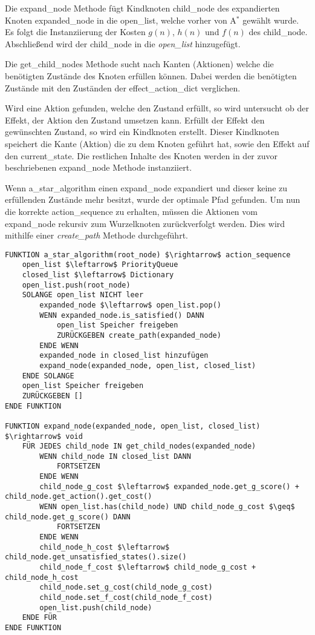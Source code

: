 Die expand\_node Methode fügt Kindknoten child\_node des expandierten Knoten expanded\_node in die open\_list, welche vorher von A$^*$ gewählt wurde. Es folgt die Instanziierung der Kosten $g(n)$, $h(n)$ und $f(n)$ des child\_node. Abschließend wird der child\_node in die \textit{open\_list} hinzugefügt.

Die get\_child\_nodes Methode sucht nach Kanten (Aktionen) welche die benötigten Zustände des Knoten erfüllen können. Dabei werden die benötigten Zustände mit den Zuständen der effect\_action\_dict verglichen.

Wird eine Aktion gefunden, welche den Zustand erfüllt, so wird untersucht ob der Effekt, der Aktion den Zustand umsetzen kann. Erfüllt der Effekt den gewünschten Zustand, so wird ein Kindknoten erstellt. Dieser Kindknoten speichert die Kante (Aktion) die zu dem Knoten geführt hat, sowie den Effekt auf den current\_state. Die restlichen Inhalte des Knoten werden in der zuvor beschriebenen expand\_node Methode instanziiert.

Wenn a\_star\_algorithm einen expand\_node expandiert und dieser keine zu erfüllenden Zustände mehr besitzt, wurde der optimale Pfad gefunden. Um nun die korrekte action\_sequence zu erhalten, müssen die Aktionen vom expand\_node rekursiv zum Wurzelknoten zurückverfolgt werden. Dies wird mithilfe einer \textit{create\_path} Methode durchgeführt.

\begin{lstlisting}[language=Pseudo, caption={update Methode des GoapAgent}, mathescape=true]
FUNKTION a_star_algorithm(root_node) $\rightarrow$ action_sequence
	open_list $\leftarrow$ PriorityQueue
	closed_list $\leftarrow$ Dictionary
	open_list.push(root_node)
	SOLANGE open_list NICHT leer
		expanded_node $\leftarrow$ open_list.pop()
		WENN expanded_node.is_satisfied() DANN
			open_list Speicher freigeben
			ZURÜCKGEBEN create_path(expanded_node)
		ENDE WENN
		expanded_node in closed_list hinzufügen
		expand_node(expanded_node, open_list, closed_list)
	ENDE SOLANGE
	open_list Speicher freigeben
	ZURÜCKGEBEN []
ENDE FUNKTION

FUNKTION expand_node(expanded_node, open_list, closed_list) $\rightarrow$ void
	FÜR JEDES child_node IN get_child_nodes(expanded_node)
		WENN child_node IN closed_list DANN
			FORTSETZEN
		ENDE WENN
		child_node_g_cost $\leftarrow$ expanded_node.get_g_score() + child_node.get_action().get_cost()
		WENN open_list.has(child_node) UND child_node_g_cost $\geq$ child_node.get_g_score() DANN
			FORTSETZEN
		ENDE WENN
		child_node_h_cost $\leftarrow$ child_node.get_unsatisfied_states().size()
		child_node_f_cost $\leftarrow$ child_node_g_cost + child_node_h_cost
		child_node.set_g_cost(child_node_g_cost)
		child_node.set_f_cost(child_node_f_cost)
		open_list.push(child_node)
	ENDE FÜR
ENDE FUNKTION
\end{lstlisting}

